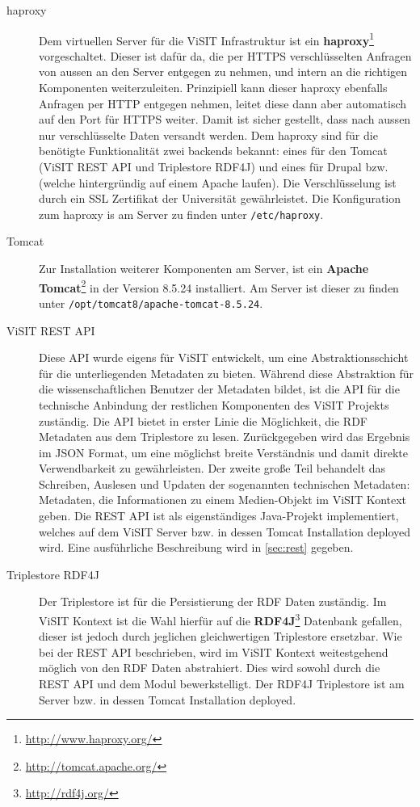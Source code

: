 \begin{description}
	\item[haproxy] Dem virtuellen Server für die ViSIT Infrastruktur ist ein \textbf{haproxy}\footnote{\url{http://www.haproxy.org/}} vorgeschaltet. Dieser ist dafür da, die per HTTPS verschlüsselten Anfragen von aussen an den Server entgegen zu nehmen, und intern an die richtigen Komponenten weiterzuleiten. Prinzipiell kann dieser haproxy ebenfalls Anfragen per HTTP entgegen nehmen, leitet diese dann aber automatisch auf den Port für HTTPS weiter. Damit ist sicher gestellt, dass nach aussen nur verschlüsselte Daten versandt werden. Dem haproxy sind für die benötigte Funktionalität zwei backends bekannt: eines für den Tomcat (ViSIT REST API und Triplestore RDF4J) und eines für Drupal bzw. \wisski (welche hintergründig auf einem Apache laufen). Die Verschlüsselung ist durch ein SSL Zertifikat der Universität gewährleistet. Die Konfiguration zum haproxy is am Server zu finden unter \texttt{/etc/haproxy}.
	\item[Tomcat] Zur Installation weiterer Komponenten am Server, ist ein \textbf{Apache Tomcat}\footnote{\url{http://tomcat.apache.org/}} in der Version 8.5.24 installiert. Am Server ist dieser zu finden unter \texttt{/opt/tomcat8/apache-tomcat-8.5.24}.
	\item[ViSIT REST API] Diese API wurde eigens für ViSIT entwickelt, um eine Abstraktionsschicht für die unterliegenden Metadaten zu bieten. Während \wisski diese Abstraktion für die wissenschaftlichen Benutzer der Metadaten bildet, ist die API für die technische Anbindung der restlichen Komponenten des ViSIT Projekts zuständig. Die API bietet in erster Linie die Möglichkeit, die RDF Metadaten aus dem Triplestore zu lesen. Zurückgegeben wird das Ergebnis im JSON Format, um eine möglichst breite Verständnis und damit direkte Verwendbarkeit zu gewährleisten. Der zweite große Teil behandelt das Schreiben, Auslesen und Updaten der sogenannten technischen Metadaten: Metadaten, die Informationen zu einem Medien-Objekt im ViSIT Kontext geben. Die REST API ist als eigenständiges Java-Projekt implementiert, welches auf dem ViSIT Server bzw. in dessen Tomcat Installation deployed wird. Eine ausführliche Beschreibung wird in \autoref{sec:rest} gegeben.
	\item[Triplestore RDF4J] Der Triplestore ist für die Persistierung der RDF Daten zuständig. Im ViSIT Kontext ist die Wahl hierfür auf die \textbf{RDF4J}\footnote{\url{http://rdf4j.org/}} Datenbank gefallen, dieser ist jedoch durch jeglichen gleichwertigen Triplestore ersetzbar. Wie bei der REST API beschrieben, wird im ViSIT Kontext weitestgehend möglich von den RDF Daten abstrahiert. Dies wird sowohl durch die REST API und dem \wisski Modul bewerkstelligt. Der RDF4J Triplestore ist am Server bzw. in dessen Tomcat Installation deployed.

\end{description}
